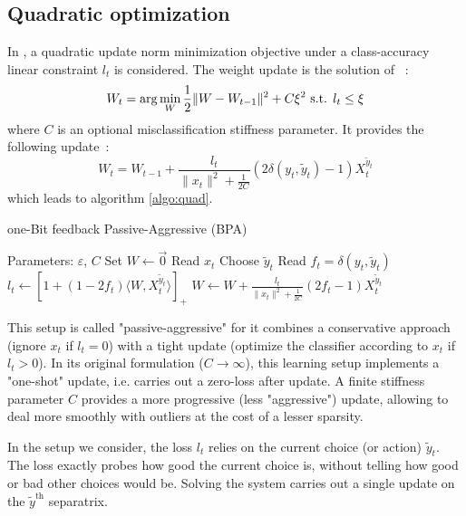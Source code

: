 \documentclass[preprint,12pt,authoryear]{elsarticle}
\begin{document}
\subsection{Quadratic optimization}
 
In \cite{crammer2006online}, a quadratic update norm minimization objective under a class-accuracy linear constraint $ l_t $ is considered.  
The weight update is the solution of ~:
$$W_{t} = \arg \min_W \frac{1}{2} \| W - W_{t-1}\|^2 + C \xi^2 \hbox{ s.t. } l_t \leq \xi$$
where $C$ is an optional misclassification stiffness parameter. It provides the following update~:
$$W_{t} =  W_{t-1} + \frac{l_t}{\|x_t\|^2 + \frac{1}{2C}} (2\delta(y_t,\tilde{y}_t) - 1) X_t^{\tilde{y}_t}$$
which leads to algorithm \ref{algo:quad}.

\begin{algorithm}[t!]
	\caption{one-Bit feedback Passive-Aggressive (BPA)}\label{algo:quad}
	\begin{algorithmic}
		\STATE Parameters:  $\varepsilon$, $C$
		\STATE Set $W \leftarrow \vec{0}$
		\STATE Read $x_t$
		\STATE Choose $\tilde{y}_t$
		\STATE Read $f_t = \delta(y_t,\tilde{y}_t)$
		\STATE $l_t \leftarrow \left[ 1+(1-2f_t)\langle W,X_t^{\tilde{y}_t}\rangle\right]_{+}$ 
		\STATE $W \leftarrow W + \frac{l_t}{\parallel x_t\parallel^2 + \frac{1}{2C}} (2f_t-1) X_t^{\tilde{y}_t}$
		\ENDFOR
	\end{algorithmic}
\end{algorithm}

This setup is called "passive-aggressive" for it combines a conservative approach (ignore $x_t$ if $l_t=0$) with a tight update (optimize the classifier according to $x_t$ if $l_t>0$).
In its original formulation ($C \rightarrow \infty$), this learning setup implements a "one-shot" update, i.e. carries out a zero-loss  after update. A finite stiffness parameter $C$ provides a more progressive (less "aggressive") update, allowing to deal more smoothly with outliers at the cost of a lesser sparsity.

In the setup we consider, the loss $l_t$ relies on the current choice (or action) $\tilde{y}_t$. The loss exactly probes how good the current choice is, without telling how good or bad other choices would be. Solving the system carries out a single update on the  $\tilde{y}^\text{th}$ separatrix. 
\end{document}
